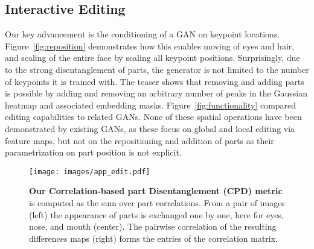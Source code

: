 \documentclass[10pt, conference, compsocconf]{IEEEtran}
\begin{document}
\subsection{Interactive Editing}
\label{sec: qualitative results}

Our key advancement is the conditioning of a GAN on keypoint locations. Figure~\ref{fig:reposition} demonstrates how this enables moving of eyes and hair, and scaling of the entire face by scaling all keypoint positions. Surprisingly, due to the strong disentanglement of parts, the generator is not limited to the number of keypoints it is trained with. The teaser shows that removing and adding parts is possible by adding and removing an arbitrary number of peaks in the Gaussian heatmap and associated embedding masks. 
Figure~\ref{fig:functionality} compared editing capabilities to related GANs. None of these spatial operations have been demonstrated by existing GANs, as these focus on global and local editing via feature maps, but not on the repositioning and addition of parts as their parametrization on part position is not explicit. 


\begin{figure}[t]
\begin{center}
\texttt{[image: images/app\_edit.pdf]}
\vspace{-10pt}
\end{center}
  \caption{\textbf{Our Correlation-based part Disentanglement (CPD) metric} is computed as the sum over part correlations. From a pair of images (left) the appearance of parts is exchanged one by one, here for eyes, nose, and mouth (center). The pairwise correlation of the resulting differences maps (right) forms the entries of the correlation matrix.}
\label{fig:CPD}
\end{figure}

\newcommand{\centertable}[1]{\begin{tabular}{@{}c@{}} \vspace{-2cm}\\#1\\ \end{tabular}}
\newcommand{\cna}{\centertable{n/a}}
\end{document}
